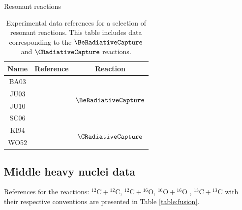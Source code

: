 \documentclass[openany]{book}
\begin{document}
Resonant reactions

\begin{table}[H]
	\centering
	\begin{tabular}{|c|c|c|}
		\hline
		Name & Reference & Reaction \\ \hline
		BA03 &\cite{baby_bordeanu_goldring_hass_weissman_fedoseyev_koster_nir-el_haquin_gaggeler_weinreich_et_2003}  &   \multirow{4}{*}{$\BeRadiativeCapture$}       \\ \cline{1-2}
		JU03 &  \cite{junghans_mohrmann_snover_steiger_adelberger_casandjian_swanson_buchmann_park_zyuzin_et_2003}  &         \\ \cline{1-2}
		JU10 &    \cite{junghans_snover_mohrmann_adelberger_buchmann_2010}  &     \\ \cline{1-2}
		SC06 &     \cite{schumann_typel_hammache_summerer_uhlig_bottcher_cortina_forster_gai_geissel_et_2006} & \\  \hline
		KI94 &    \cite{king_azuma_vise_gorres_rolfs_trautvetter_vlieks_1994} &   \multirow{2}{*}{$\CRadiativeCapture$}         \\ \cline{1-2}
		WO52 &   \cite{woodbury_fowler_1952}
		 &      \\ \hline
	\end{tabular}
	\caption[References $\BeRadiativeCapture$ and $\CRadiativeCapture$ experimental data]{Experimental data references for a selection of resonant reactions. This table includes data corresponding to the $\BeRadiativeCapture$ and $\CRadiativeCapture$ reactions.}
	\label{table:light_resonant}
\end{table}



\subsection{Middle heavy nuclei data} \label{sub:middleHeavyData}

References for the reactions: $\mathrm{{}^{12}C + {}^{12}C}$, $\mathrm{{}^{12}C + {}^{16}O}$,  $\mathrm{{}^{16}O + {}^{16}O}$ ,  $\mathrm{{}^{13}C + {}^{13}C}$ with their respective conventions are presented in Table \ref{table:fusion}.
\end{document}
